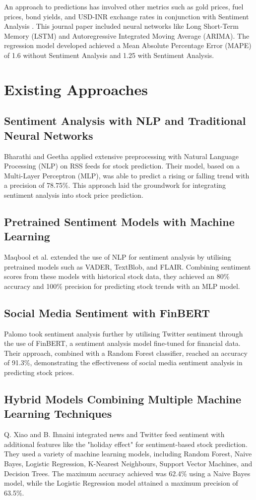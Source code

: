 \documentclass[conference]{IEEEtran}
\begin{document}
An approach to predictions has involved other metrics such as gold prices, fuel prices, bond yields, and USD-INR exchange rates in conjunction with Sentiment Analysis \cite{stockprice2021}. This journal paper included neural networks like Long Short-Term Memory (LSTM) and Autoregressive Integrated Moving Average (ARIMA). The regression model developed achieved a Mean Absolute Percentage Error (MAPE) of 1.6 without Sentiment Analysis and 1.25 with Sentiment Analysis.

\section{Existing Approaches}
\subsection{Sentiment Analysis with NLP and Traditional Neural Networks}
Bharathi and Geetha \cite{bharathi2017} applied extensive preprocessing with Natural Language Processing (NLP) on RSS feeds for stock prediction. Their model, based on a Multi-Layer Perceptron (MLP), was able to predict a rising or falling trend with a precision of 78.75\%. This approach laid the groundwork for integrating sentiment analysis into stock price prediction.

\subsection{Pretrained Sentiment Models with Machine Learning}
Maqbool et al. \cite{maqbool2023} extended the use of NLP for sentiment analysis by utilising pretrained models such as VADER, TextBlob, and FLAIR. Combining sentiment scores from these models with historical stock data, they achieved an 80\% accuracy and 100\% precision for predicting stock trends with an MLP model.

\subsection{Social Media Sentiment with FinBERT}
Palomo \cite{palomo} took sentiment analysis further by utilising Twitter sentiment through the use of FinBERT, a sentiment analysis model fine-tuned for financial data. Their approach, combined with a Random Forest classifier, reached an accuracy of 91.3\%, demonstrating the effectiveness of social media sentiment analysis in predicting stock prices.

\subsection{Hybrid Models Combining Multiple Machine Learning Techniques}
Q. Xiao and B. Ihnaini \cite{xiao2023} integrated news and Twitter feed sentiment with additional features like the "holiday effect" for sentiment-based stock prediction. They used a variety of machine learning models, including Random Forest, Naive Bayes, Logistic Regression, K-Nearest Neighbours, Support Vector Machines, and Decision Trees. The maximum accuracy achieved was 62.4\% using a Naive Bayes model, while the Logistic Regression model attained a maximum precision of 63.5\%.
\end{document}
